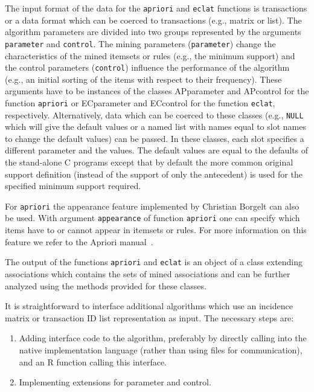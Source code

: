 \documentclass[10pt,a4paper]{article}
\newcommand{\class}[1]{\textsf{#1}}
\newcommand{\code}[1]{\texttt{#1}}
\newcommand{\proglang}[1]{\textsf{#1}}
\begin{document}
The input format of the data for the \code{apriori} and
\code{eclat} functions is
\class{transactions} or a data format which can be coerced to
\class{transactions} (e.g., \class{matrix} or \class{list}).
The algorithm parameters are divided into two groups represented
by the arguments \code{parameter} and \code{control}.
The mining parameters (\code{parameter}) change the
characteristics of the mined itemsets or rules  (e.g., the
minimum support) and the control parameters (\code{control})
influence the
performance of the algorithm (e.g., an initial sorting of the items
with respect to their frequency).
These arguments have to be instances of the
classes \class{APparameter} and \class{APcontrol} for
the function \code{apriori}
or \class{ECparameter} and \class{ECcontrol} for
the function \code{eclat}, respectively.  Alternatively, data which can be coerced to
these classes (e.g., \code{NULL}
which will give the default values or a named list
with names equal to slot names to change the default values) can be passed.
In these classes, each slot specifies a different parameter and the values.  The
default values are equal to the defaults of the stand-alone \proglang{C}
programs \citep{arules:Borgelt:2004} except that by
default the more common original
support definition (instead of the
support of only the antecedent)
is used for the specified minimum support required.

For \code{apriori} the appearance feature implemented by Christian
Borgelt can also be used.  With argument \code{appearance} of function
\code{apriori} one can specify which items have to or cannot appear in
itemsets or rules.  For more information on this feature we refer to the
Apriori manual~\citep{arules:Borgelt:2004}.

The output of the functions \code{apriori} and \code{eclat} is an object
of a class extending \class{associations} which contains the sets of mined
associations and can be further analyzed using the methods provided for
these classes.

It is straightforward to interface additional algorithms which use an
incidence matrix or transaction ID list representation as input.  The
necessary steps are:

\begin{enumerate}
 \item Adding interface code to the algorithm, preferably by directly
  calling into the native implementation language (rather than using
  files for communication), and an \proglang{R} function calling this
  interface.
 \item Implementing extensions for \class{parameter} and
  \class{control}.
\end{enumerate}
\end{document}
